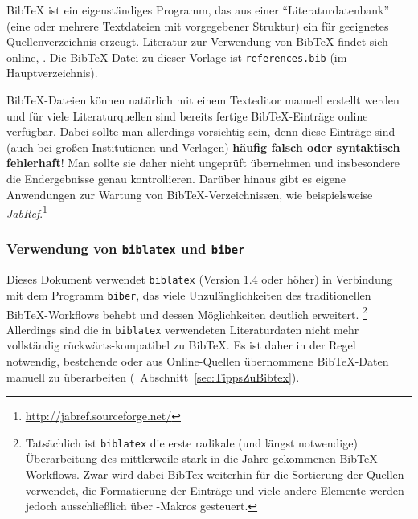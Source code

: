 BibTeX ist ein eigenständiges Programm, das aus einer "`Literaturdatenbank"' (eine oder mehrere
Textdateien mit vorgegebener Struktur) ein für \latex geeignetes Quellenverzeichnis
erzeugt. Literatur zur Verwendung von BibTeX findet sich online, \zB \cite{Feder2006, Patashnik1988}.
Die BibTeX-Datei zu dieser Vorlage ist \nolinkurl{references.bib} (im Hauptverzeichnis).

BibTeX-Dateien können natürlich mit einem Texteditor manuell erstellt werden und für
viele Literaturquellen sind bereits fertige BibTeX-Einträge online verfügbar.
Dabei sollte man allerdings vorsichtig sein, denn diese Einträge sind (auch bei großen
Institutionen und Verlagen) \textbf{häufig falsch oder syntaktisch fehlerhaft}!
Man sollte sie daher nicht ungeprüft übernehmen und insbesondere die Endergebnisse genau kontrollieren.
Darüber hinaus gibt es eigene Anwendungen zur Wartung von
BibTeX-Verzeichnissen, wie beispielsweise
\emph{JabRef}.\footnote{\url{http://jabref.sourceforge.net/}}


\subsubsection{Verwendung von \texttt{biblatex} und \texttt{biber}}

Dieses Dokument verwendet \texttt{biblatex} (Version 1.4 oder höher) in Verbindung
mit dem Programm \texttt{biber}, 
das viele Unzulänglichkeiten des traditionellen BibTeX-Work\-flows behebt und dessen Möglichkeiten deutlich erweitert.%
\footnote{Tatsächlich ist \texttt{biblatex} die erste radikale (und längst notwendige) Überarbeitung des mittlerweile stark in die Jahre gekommenen BibTeX-Workflows. Zwar wird dabei BibTex weiterhin für 
die Sortierung der Quellen verwendet, die Formatierung der Einträge und viele andere Elemente werden jedoch ausschließlich über \latex-Makros gesteuert.}
Allerdings sind die in \texttt{biblatex} verwendeten Literaturdaten nicht mehr vollständig 
rückwärts-kompatibel zu BibTeX. Es ist daher in der Regel notwendig, bestehende oder aus
Online-Quellen übernommene BibTeX-Daten manuell zu überarbeiten (\sa\ Abschnitt~\ref{sec:TippsZuBibtex}).

